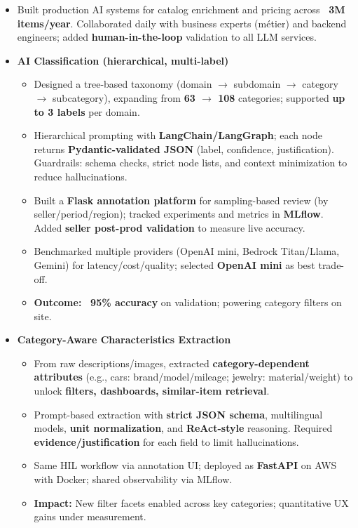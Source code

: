 \documentclass[10pt,a4paper]{altacv}
\begin{document}
\begin{itemize}
  \item Built production AI systems for catalog enrichment and pricing across \textbf{~3M items/year}. Collaborated daily with business experts (m\'etier) and backend engineers; added \textbf{human-in-the-loop} validation to all LLM services.
  \item \textbf{AI Classification (hierarchical, multi-label)}
  \begin{itemize}
    \item Designed a tree-based taxonomy (domain $\rightarrow$ subdomain $\rightarrow$ category $\rightarrow$ subcategory), expanding from \textbf{63 $\rightarrow$ 108} categories; supported \textbf{up to 3 labels} per domain.
    \item Hierarchical prompting with \textbf{LangChain/LangGraph}; each node returns \textbf{Pydantic-validated JSON} (label, confidence, justification). Guardrails: schema checks, strict node lists, and context minimization to reduce hallucinations.
    \item Built a \textbf{Flask annotation platform} for sampling-based review (by seller/period/region); tracked experiments and metrics in \textbf{MLflow}. Added \textbf{seller post-prod validation} to measure live accuracy.
    \item Benchmarked multiple providers (OpenAI mini, Bedrock Titan/Llama, Gemini) for latency/cost/quality; selected \textbf{OpenAI mini} as best trade-off.
    \item \textbf{Outcome:} \textbf{~95\% accuracy} on validation; powering category filters on site.
  \end{itemize}
  \item \textbf{Category-Aware Characteristics Extraction}
  \begin{itemize}
    \item From raw descriptions/images, extracted \textbf{category-dependent attributes} (e.g., cars: brand/model/mileage; jewelry: material/weight) to unlock \textbf{filters, dashboards, similar-item retrieval}.
    \item Prompt-based extraction with \textbf{strict JSON schema}, multilingual models, \textbf{unit normalization}, and \textbf{ReAct-style} reasoning. Required \textbf{evidence/justification} for each field to limit hallucinations.
    \item Same HIL workflow via annotation UI; deployed as \textbf{FastAPI} on AWS with Docker; shared observability via MLflow.
    \item \textbf{Impact:} New filter facets enabled across key categories; quantitative UX gains under measurement.

\end{itemize}
\end{itemize}
\end{document}
